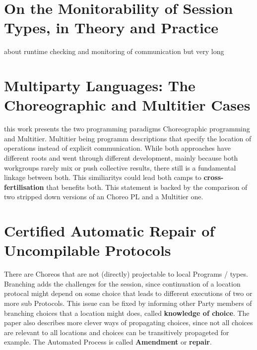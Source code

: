 \section{On the Monitorability of Session Types, in Theory
and Practice}
about runtime checking and monitoring of communication but very long

\section{Multiparty Languages: The Choreographic and
Multitier Cases}

this work presents the two programming paradigms Choreographic programming and Multitier. Multitier being programm descriptions that specify the location of operations instead of explicit communication. While both approaches have different roots and went through different development, mainly because both workgroups rarely mix or push collective results, there still is a fundamental linkage between both. This similiaritys could lead both camps to \textbf{cross-fertilisation} that benefits both. This statement is backed by the comparison of two stripped down versions of an Choreo PL and a Multitier one.

\section{Certified Automatic Repair of Uncompilable Protocols}
There are Choreos that are not (directly) projectable to local Programs / types. Branching adds the challenges for the session, since continuation of a location protocal might depend on some choice that leads to different executions of two or more sub Protocols. This issue can be fixed by informing other Party members of branching choices that a location might does, called \textbf{knowledge of choice}. The paper also describes more clever ways of propagating choices, since not all choices are relevant to all locations and choices can be transitively propageted for example. The Automated Process is called \textbf{Amendment} or \textbf{repair}.
